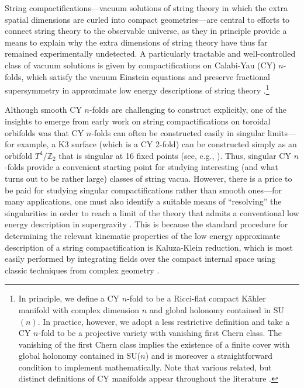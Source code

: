 \documentclass[11pt,oneside,english]{article}
\numberwithin{equation}{section}
\theoremstyle{definition}
\begin{document}
String compactifications---vacuum solutions of string theory in which the extra spatial dimensions are curled into compact geometries---are central to efforts to connect string theory to the observable universe, as they in principle provide a means to explain why the extra dimensions of string theory have thus far remained experimentally undetected. A particularly tractable and well-controlled class of vacuum solutions is given by compactifications on Calabi-Yau (CY) $n$-folds, which satisfy the vacuum Einstein equations and preserve fractional supersymmetry in approximate low energy descriptions of string theory \cite{JoyceCompact}.\footnote{In principle, we define a CY $n$-fold to be a Ricci-flat compact K\"ahler manifold with complex dimension $n$ and global holonomy contained in SU$(n)$. In practice, however, we adopt a less restrictive definition and take a CY $n$-fold to be a projective variety with vanishing first Chern class. The vanishing of the first Chern class implies the existence of a finite cover with global holonomy contained in SU($n$) and is moreover a straightforward condition to implement mathematically. Note that various related, but distinct definitions of CY manifolds appear throughout the literature \cite{TianYau1,TianYau2,GHJ}.} 

Although smooth CY $n$-folds are challenging to construct explicitly, one of the insights to emerge from early work on string compactifications on toroidal orbifolds \cite{Dixon:1985jw} was that CY $n$-folds can often be constructed easily in singular limits---for example, a K3 surface (which is a CY 2-fold) can be constructed simply as an orbifold $T^4/\mathbb Z_2$ that is singular at 16 fixed points (see, e.g., \cite{Vafa:1997pm}). Thus, singular CY $n$-folds provide a convenient starting point for studying interesting (and what turns out to be rather large) classes of string vacua. However, there is a price to be paid for studying singular compactifications rather than smooth ones---for many applications, one must also identify a suitable means of ``resolving'' the singularities in order to reach a limit of the theory that admits a conventional low energy description in supergravity \cite{Aspinwall:1994ev}. This is because the standard procedure for determining the relevant kinematic properties of the low energy approximate description of a string compactification is Kaluza-Klein reduction, which is most easily performed by integrating fields over the compact internal space using classic techniques from complex geometry \cite{becker_becker_schwarz_2006}.
\end{document}
